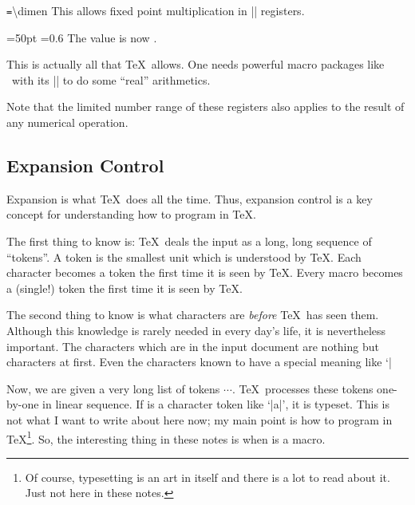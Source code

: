 \documentclass[a4paper,doc2]{ltxdoc}
\begin{document}
\begin{command}{\dimen{}\texttt{=}\textbackslash dimen}
	This allows fixed point multiplication in |\dimen| registers.
\begin{codeexample}[]
=50pt
=0.6
The value is now \the{}.
\end{codeexample}
\end{command}

This is actually all that \TeX\ allows. One needs powerful macro packages like \PGF\ with its |\pgfmathparse| to do some ``real'' arithmetics.

Note that the limited number range of these registers also applies to the result of any numerical operation.


\subsection{Expansion Control}
\label{sec:expansion:control}
Expansion is what \TeX\ does all the time. Thus, expansion control is a key concept for understanding how to program in \TeX.

The first thing to know is: \TeX\ deals the input as a long, long sequence of ``tokens''. A token is the smallest unit which is understood by \TeX. Each character becomes a token the first time it is seen by \TeX. Every macro becomes a (single!) token the first time it is seen by \TeX.

The second thing to know is what characters are \emph{before} \TeX\ has seen them. Although this knowledge is rarely needed in every day's life, it is nevertheless important. The characters which are in the input document are nothing but characters at first. Even the characters known to have a special meaning like `|%

Now, we are given a very long list of tokens $\cdots$. \TeX\ processes these tokens one-by-one in linear sequence. If  is a character token like `|a|', it is typeset. This is not what I want to write about here now; my main point is how to program in \TeX\footnote{Of course, typesetting is an art in itself and there is a lot to read about it. Just not here in these notes.}. So, the interesting thing in these notes is when  is a macro.
\end{document}
